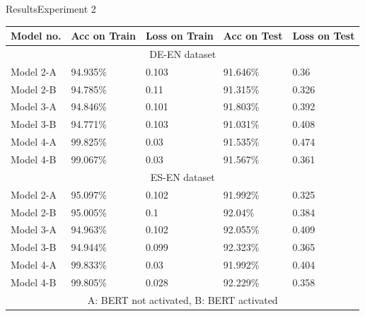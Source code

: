 \documentclass[
]{beamer}
\begin{document}
\begin{frame}{Results}{Experiment 2}

\begin{table}
\scriptsize
    \begin{tabular}{|p{2.0cm}||p{2.0cm}|p{2.0cm}|p{2.0cm}|p{2.0cm}|  }
     \hline
    Model no.& Acc on Train	& Loss on Train & Acc on Test & Loss on Test\\
     \hline
     \multicolumn{5}{|c|}{DE-EN dataset} \\
     \hline
    Model 2-A&  94.935\%  &  0.103  &  91.646\%  &  0.36 \\
    Model 2-B&  94.785\%  &  0.11  &  91.315\%  &  0.326 \\
    Model 3-A&  94.846\%  &  0.101  &  91.803\%  &  0.392 \\
    Model 3-B&  94.771\%  &  0.103  &  91.031\%  &  0.408 \\
    Model 4-A&  99.825\%  &  0.03  &  91.535\%  &  0.474 \\
    Model 4-B&  99.067\%  &  0.03  &  91.567\%  &  0.361 \\
     \hline
     \multicolumn{5}{|c|}{ES-EN dataset} \\
     \hline
    Model 2-A&  95.097\%  &  0.102  &  91.992\%  &  0.325 \\
    Model 2-B&  95.005\%  &  0.1  &  92.04\%  &  0.384 \\
    Model 3-A&  94.963\%  &  0.102  &  92.055\%  &  0.409 \\
    Model 3-B&  94.944\%  &  0.099  &  92.323\%  &  0.365 \\
    Model 4-A&  99.833\%  &  0.03  &  91.992\%  &  0.404 \\
    Model 4-B&  99.805\%  &  0.028  &  92.229\%  &  0.358 \\
     \hline
     \multicolumn{5}{|c|}{A: BERT not activated, B: BERT activated} \\
     \hline
    \end{tabular}
\end{table}

\end{frame}
\end{document}
